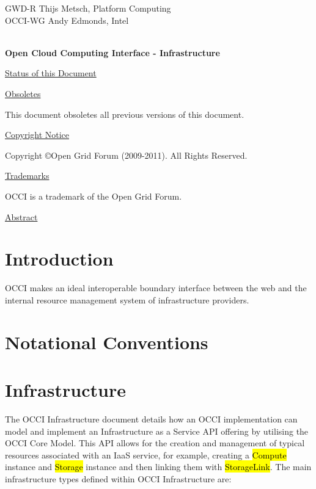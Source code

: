 \documentclass[10pt,a4paper]{article}
\begin{document}
\thispagestyle{empty}

GWD-R \hfill  Thijs Metsch, Platform Computing\\
OCCI-WG \hfill  Andy Edmonds, Intel\\
\\

\vspace*{0.5in}

\begin{Large}
\textbf{Open Cloud Computing Interface - Infrastructure}
\end{Large}

\vspace*{0.5in}

\underline{Status of this Document}



\underline{Obsoletes}

This document obsoletes all previous versions of this document.

\underline{Copyright Notice}

Copyright \copyright Open Grid Forum (2009-2011). All Rights Reserved.

\underline{Trademarks}

OCCI is a trademark of the Open Grid Forum.

\underline{Abstract}



\newpage
\tableofcontents
\newpage

\section{Introduction}


OCCI makes an ideal interoperable boundary interface between the web and the
internal resource management system of infrastructure providers.

\section{Notational Conventions}



\section{Infrastructure}
The OCCI Infrastructure document details how an OCCI implementation can model and implement an
Infrastructure as a Service API offering by utilising the OCCI Core Model. This API allows for the creation and management of typical resources associated with an IaaS service, for example, creating a \hl{Compute} instance and \hl{Storage} instance and then linking them with \hl{StorageLink}. The main infrastructure types defined within OCCI Infrastructure are:
\end{document}
